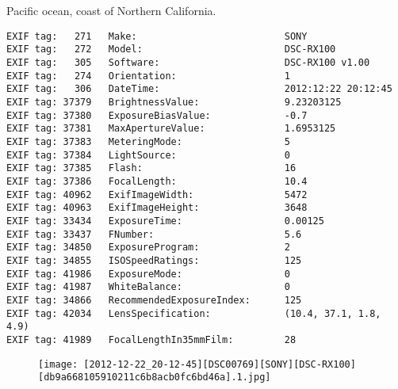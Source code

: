 \section{\protect{}}
\noindent Pacific ocean, coast of Northern California.
\noindent
\begin{lstlisting}
EXIF tag:   271   Make:                          SONY
EXIF tag:   272   Model:                         DSC-RX100
EXIF tag:   305   Software:                      DSC-RX100 v1.00
EXIF tag:   274   Orientation:                   1
EXIF tag:   306   DateTime:                      2012:12:22 20:12:45
EXIF tag: 37379   BrightnessValue:               9.23203125
EXIF tag: 37380   ExposureBiasValue:             -0.7
EXIF tag: 37381   MaxApertureValue:              1.6953125
EXIF tag: 37383   MeteringMode:                  5
EXIF tag: 37384   LightSource:                   0
EXIF tag: 37385   Flash:                         16
EXIF tag: 37386   FocalLength:                   10.4
EXIF tag: 40962   ExifImageWidth:                5472
EXIF tag: 40963   ExifImageHeight:               3648
EXIF tag: 33434   ExposureTime:                  0.00125
EXIF tag: 33437   FNumber:                       5.6
EXIF tag: 34850   ExposureProgram:               2
EXIF tag: 34855   ISOSpeedRatings:               125
EXIF tag: 41986   ExposureMode:                  0
EXIF tag: 41987   WhiteBalance:                  0
EXIF tag: 34866   RecommendedExposureIndex:      125
EXIF tag: 42034   LensSpecification:             (10.4, 37.1, 1.8, 4.9)
EXIF tag: 41989   FocalLengthIn35mmFilm:         28

\end{lstlisting}
\clearpage
\begin{figure}
\raggedleft
\texttt{[image: [2012-12-22\_20-12-45][DSC00769][SONY][DSC-RX100][db9a668105910211c6b8acb0fc6bd46a].1.jpg]}
\end{figure}


\clearpage
